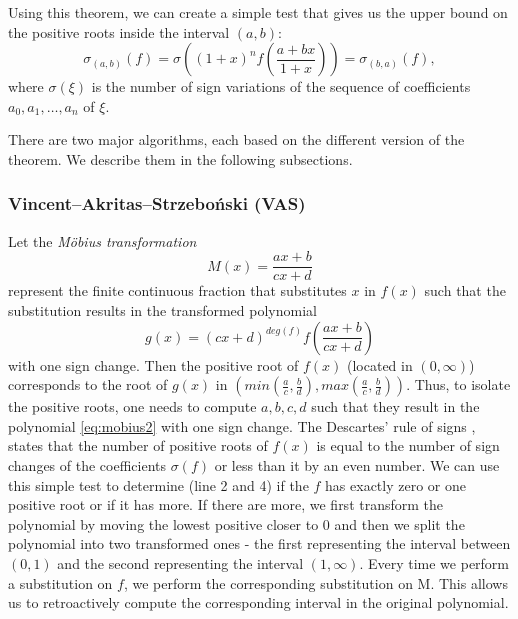 \documentclass[
  digital, %
  notable,   %
  nolof,     %
  nolot,     %
	final, %
]{fithesis3}
\begin{document}
Using this theorem, we can create a simple test that gives us the upper bound on the positive roots inside the interval $(a,b)$:
\begin{equation}
\sigma_{\left(a,b\right)}(f) = \sigma\left((1 + x)^{n} f\left(\frac{a + bx}{1 + x}\right)\right) = \sigma_{\left(b,a\right)}(f),
\label{eq:a_b_test}
\end{equation}
where $\sigma(\xi)$ is the number of sign variations of the sequence of coefficients $a_{0}, a_{1},\ldots,a_{n}$ of $\xi$.

There are two major algorithms, each based on the different version of the theorem. We describe them in the following subsections.
\subsubsection{\textbf{Vincent–Akritas–Strzeboński (VAS)} \parencite{vas}}
Let the \textit{M{\"o}bius transformation} \parencite{mobius}
\begin{equation}
M(x) = \frac{ax+b}{cx+d} \tag*{$a,b,c,d\in\N;ad-bd\neq 0$}
\label{eq:mobius}
\end{equation}
represent the finite continuous fraction that substitutes $x$ in $f(x)$ such that the substitution results in the transformed polynomial 
\begin{equation}
\label{eq:mobius2}
g(x)=(cx+d)^{deg(f)}f\left(\frac{ax+b}{cx+d}\right)
\end{equation} with one sign change. Then the positive root of $f(x)$ (located in $(0,\infty)$) corresponds to the root of $g(x)$ in $(min(\frac{a}{c},\frac{b}{d}), max(\frac{a}{c},\frac{b}{d}))$. Thus, to isolate the positive roots, one needs to compute $a,b,c,d$ such that they result in the polynomial \eqref{eq:mobius2} with one sign change.
The Descartes' rule of signs \parencite{descart}, states that the number of positive roots of $f(x)$ is equal to the number of sign changes of the coefficients $\sigma(f)$ or less than it by an even number. We can use this simple test to determine (line 2 and 4) if the $f$ has exactly zero or one positive root or if it has more. If there are more, we first transform the polynomial by moving the lowest positive closer to 0 and then we split the polynomial into two transformed ones - the first representing the interval between $(0,1)$ and the second representing the interval $(1,\infty)$. Every time we perform a substitution on $f$, we perform the corresponding substitution on M. This allows us to retroactively compute the corresponding interval in the original polynomial.
\end{document}

